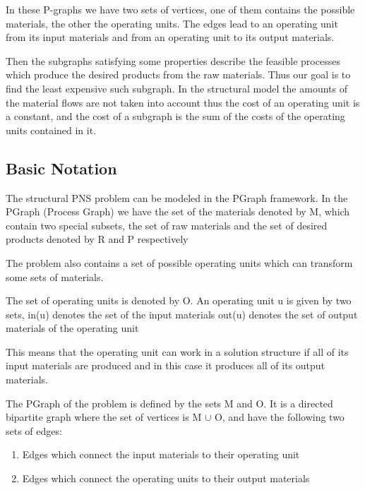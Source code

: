 In these P-graphs we have two sets of vertices, one of them contains the possible materials,
the other the operating units. The edges lead to an operating unit from its input materials 
and from an operating unit to its output materials. 
 \cite{pns6} \cite{pns3}

Then the subgraphs satisfying some properties describe the feasible processes
which produce the desired products from the raw materials.
Thus our goal is to find the least expensive such subgraph. 
In the structural model the amounts of the material flows are not taken into account 
thus the cost of an operating unit is a constant, and the cost of a subgraph 
is the sum of the costs of the operating units contained in it. \cite{pns3} \cite{pns1}
\subsection{ Basic Notation }

The structural PNS problem can be modeled in the PGraph framework.
In the PGraph (Process Graph) we have the set of the materials denoted by M,
which contain two special subsets, the set of raw materials and the set of 
desired products denoted by R and P respectively \cite{pns3}

The problem also contains a set of possible operating units which can transform some sets of materials. 

The set of operating units is denoted by O. An operating unit u is given by two sets, 
in(u) denotes the set of the input materials out(u) denotes the set of output materials of the operating unit

This means that the operating unit can work in a solution structure if all of its input materials are produced and in this case it 
produces all of its output materials. \cite{pns3}  \cite{pns1}

The PGraph  of the problem is defined by the sets M and O. It is a directed bipartite graph where the set of vertices is M $\cup$ O, and have the following two sets of edges:
\begin{enumerate}
\item Edges which connect the input materials to their operating unit
\item Edges which connect the operating units to their output materials
\end{enumerate}

